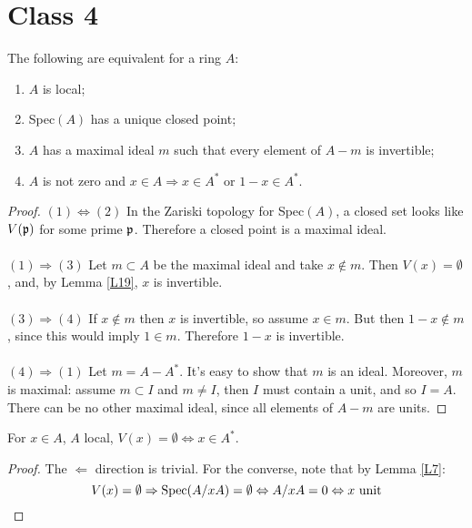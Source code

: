 \documentclass{../mathnotes}
\begin{document}
\section*{Class 4}

\begin{lem}
\label{L18}
The following are equivalent for a ring $A$:
\begin{enumerate}[(1)]
\item $A$ is local;
\item Spec$(A)$ has a unique closed point;
\item $A$ has a maximal ideal $m$ such that every element of $A-m$ is invertible;
\item $A$ is not zero and $x\in A \Rightarrow x\in A^*$ or $1-x \in A^*$.
\end{enumerate}
\end{lem}

\begin{proof}
$(1) \Leftrightarrow (2)$ In the Zariski topology for Spec$(A)$, a closed set looks like $V(\mathfrak p)$ for some prime $\mathfrak p$. Therefore a closed point is a maximal ideal.
\\
\\
$(1) \Rightarrow (3)$ Let $m\subset A$ be the maximal ideal and take $x\not \in m$. Then $V(x) = \emptyset$, and, by Lemma \ref{L19}, $x$ is invertible.
\\
\\
$(3) \Rightarrow (4)$ If $x\not \in m$ then $x$ is invertible, so assume $x\in m$. But then $1-x \not \in m$, since this would imply $1\in m$. Therefore $1-x$ is invertible.
\\
\\
$(4) \Rightarrow (1)$ Let $m = A - A^*$. It's easy to show that $m$ is an ideal. Moreover, $m$ is maximal: assume $m\subset I$ and $m\neq I$, then $I$ must contain a unit, and so $I = A$. There can be no other maximal ideal, since all elements of $A-m$ are units.
\end{proof}


\begin{lem}
\label{L19}
For $x\in A$, $A$ local, $V(x) = \emptyset \Leftrightarrow x\in A^*$.
\end{lem}
\begin{proof}
The $\Leftarrow$ direction is trivial. For the converse, note that by Lemma \ref{L7}:
\[ V(x) = \emptyset \Rightarrow \operatorname{Spec}(A/xA) = \emptyset \Leftrightarrow A/xA = 0 \Leftrightarrow x \text{ unit} \]
\end{proof}
\end{document}

